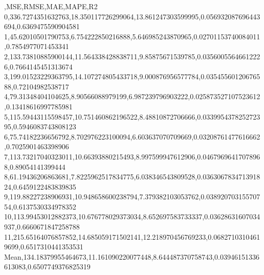 ,MSE,RMSE,MAE,MAPE,R2
0,336.7274351632763,18.350117726299064,13.861247303599995,0.056932087696443694,0.6369475590904581
1,45.62010501790753,6.754222850216888,5.646985243870965,0.02701153740084011,0.7854977071453341
2,133.73810885900144,11.564338428838711,9.85875671539785,0.03560055646612226,0.7664145451313674
3,199.01523229363795,14.107274805433718,9.000876956577784,0.03545560120676588,0.72104982538717
4,79.31348404104625,8.90566088979199,6.987239796903222,0.025873527107523612,0.13418616997785981
5,115.59443115598457,10.751460862196522,8.48810872706666,0.033995437825272395,0.5946083743808123
6,75.74182236656792,8.702976223100094,6.603637070709669,0.03208761477616662,0.7025901463398906
7,113.73217040323011,10.66393880215493,8.997599947612906,0.04679696417078968,0.89054141399444
8,61.19436206863681,7.8225962517834775,6.038346543809528,0.036306783471391824,0.6459122483839835
9,119.88227238906931,10.948658600238794,7.379382103053762,0.03892070315570754,0.6137530334978352
10,113.99453012882373,10.676778029373034,8.652697583733337,0.03628631607034937,0.6660671847258788
11,215.65164076857852,14.685059171502141,12.218970456769233,0.06827103104619699,0.6517310441353531
Mean,134.18379955464673,11.161090220077448,8.644487370758743,0.03946151336613083,0.6507749376825319
